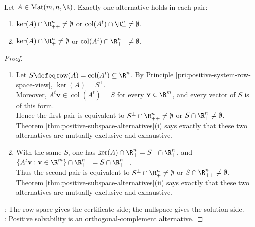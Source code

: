 \begin{theorem} \label{thm:homogeneous-positive-solution-alternatives} \\
Let $A\in\operatorname{Mat}(m,n,\R)$. Exactly one alternative holds in each pair:
\begin{enumerate}[label=(\roman*)]
\setlength{\itemsep}{0pt}
\item $\ker(A)\cap\R_{++}^n\neq\emptyset$ or $\operatorname{col}(A^t)\cap\R_+^n\neq\emptyset$.
\item $\ker(A)\cap\R_+^n\neq\emptyset$ or $\operatorname{col}(A^t)\cap\R_{++}^n\neq\emptyset$.
\end{enumerate}
\begin{proof}
\begin{enumerate}[label=(\roman*)]
\setlength{\itemsep}{0pt}
\item Let $S\defeq\operatorname{row}(A)=\operatorname{col}(A^t)\subseteq\R^n$. By Principle \ref{pri:positive-system-row-space-view}, $\ker(A)=S^\perp$.\\
Moreover, $A^t\mathbf{v}\in\operatorname{col}(A^t)=S$ for every $\mathbf{v}\in\R^m$, and every vector of $S$ is of this form.\\
Hence the first pair is equivalent to $S^\perp\cap\R_{++}^n\neq\emptyset$ or $S\cap\R_+^n\neq\emptyset$.\\
Theorem \ref{thm:positive-subspace-alternatives}(i) says exactly that these two alternatives are mutually exclusive and exhaustive.
\item With the same $S$, one has $\ker(A)\cap\R_+^n=S^\perp\cap\R_+^n$, and $\{A^t\mathbf{v}:\mathbf{v}\in\R^m\}\cap\R_{++}^n=S\cap\R_{++}^n$.\\
Thus the second pair is equivalent to $S^\perp\cap\R_+^n\neq\emptyset$ or $S\cap\R_{++}^n\neq\emptyset$.\\
Theorem \ref{thm:positive-subspace-alternatives}(ii) says exactly that these two alternatives are mutually exclusive and exhaustive.
\end{enumerate}
: The row space gives the certificate side; the nullspace gives the solution side.\\
: Positive solvability is an orthogonal-complement alternative.
\end{proof}
\end{theorem}

